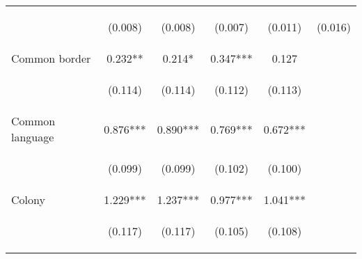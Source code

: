 \begin{center}
\begin{tabular}{lccccc}
\vspace{4pt} & \begin{footnotesize}(0.008)\end{footnotesize} & \begin{footnotesize}(0.008)\end{footnotesize} & \begin{footnotesize}(0.007)\end{footnotesize} & \begin{footnotesize}(0.011)\end{footnotesize} & \begin{footnotesize}(0.016)\end{footnotesize} \\
Common border & 0.232** & 0.214* & 0.347*** & 0.127 &  \\
\vspace{4pt} & \begin{footnotesize}(0.114)\end{footnotesize} & \begin{footnotesize}(0.114)\end{footnotesize} & \begin{footnotesize}(0.112)\end{footnotesize} & \begin{footnotesize}(0.113)\end{footnotesize} & \begin{footnotesize}\end{footnotesize} \\
Common language & 0.876*** & 0.890*** & 0.769*** & 0.672*** &  \\
\vspace{4pt} & \begin{footnotesize}(0.099)\end{footnotesize} & \begin{footnotesize}(0.099)\end{footnotesize} & \begin{footnotesize}(0.102)\end{footnotesize} & \begin{footnotesize}(0.100)\end{footnotesize} & \begin{footnotesize}\end{footnotesize} \\
Colony & 1.229*** & 1.237*** & 0.977*** & 1.041*** &  \\
\vspace{4pt} & \begin{footnotesize}(0.117)\end{footnotesize} & \begin{footnotesize}(0.117)\end{footnotesize} & \begin{footnotesize}(0.105)\end{footnotesize} & \begin{footnotesize}(0.108)\end{footnotesize} & \begin{footnotesize}\end{footnotesize} \\

\end{tabular}
\end{center}
